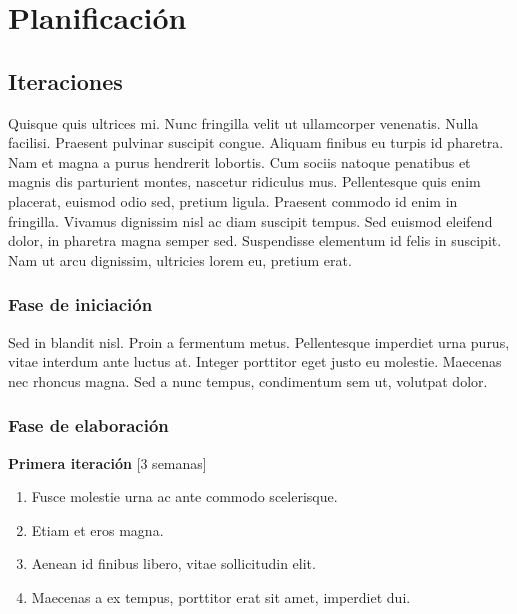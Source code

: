 \documentclass[a4paper, 10pt, twoside]{article}
\begin{document}
\newpage


\section{Planificación}

\subsection{Iteraciones}
Quisque quis ultrices mi. Nunc fringilla velit ut ullamcorper venenatis. Nulla facilisi. Praesent pulvinar suscipit congue. Aliquam finibus eu turpis id pharetra. Nam et magna a purus hendrerit lobortis. Cum sociis natoque penatibus et magnis dis parturient montes, nascetur ridiculus mus. Pellentesque quis enim placerat, euismod odio sed, pretium ligula. Praesent commodo id enim in fringilla. Vivamus dignissim nisl ac diam suscipit tempus. Sed euismod eleifend dolor, in pharetra magna semper sed. Suspendisse elementum id felis in suscipit. Nam ut arcu dignissim, ultricies lorem eu, pretium erat.

\subsubsection{Fase de iniciación}
Sed in blandit nisl. Proin a fermentum metus. Pellentesque imperdiet urna purus, vitae interdum ante luctus at. Integer porttitor eget justo eu molestie. Maecenas nec rhoncus magna. Sed a nunc tempus, condimentum sem ut, volutpat dolor.

\subsubsection{Fase de elaboración}

\textbf{Primera iteración} [3 semanas]
\begin{enumerate}
\item Fusce molestie urna ac ante commodo scelerisque.
\item Etiam et eros magna.
\item Aenean id finibus libero, vitae sollicitudin elit.
\item Maecenas a ex tempus, porttitor erat sit amet, imperdiet dui.
\end{enumerate}
\end{document}
